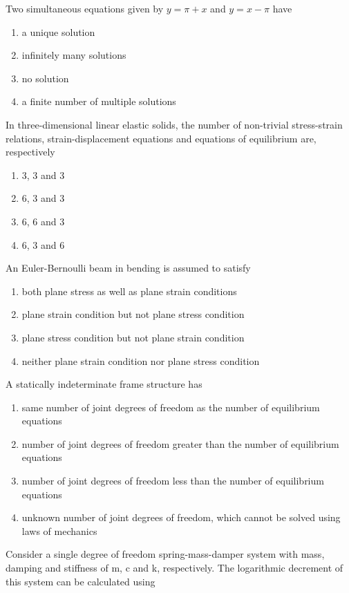 \item Two simultaneous equations given by $y = \pi + x$ and $y = x - \pi$ have
	\begin{enumerate}
		\item a unique solution
		\item infinitely many solutions
		\item no solution
		\item a finite number of multiple solutions
	\end{enumerate}
\item In three-dimensional linear elastic solids, the number of non-trivial stress-strain relations, strain-displacement equations and equations of equilibrium are, respectively
	\begin{enumerate}
		\item 3, 3 and 3
		\item 6, 3 and 3
		\item 6, 6 and 3
		\item 6, 3 and 6
	\end{enumerate}
\item An Euler-Bernoulli beam in bending is assumed to satisfy
	\begin{enumerate}
		\item both plane stress as well as plane strain conditions
		\item plane strain condition but not plane stress condition
		\item plane stress condition but not plane strain condition
		\item neither plane strain condition nor plane stress condition
	\end{enumerate}
\item A statically indeterminate frame structure has
	\begin{enumerate}
		\item same number of joint degrees of freedom as the number of equilibrium equations
		\item number of joint degrees of freedom greater than the number of equilibrium equations
		\item number of joint degrees of freedom less than the number of equilibrium equations
		\item unknown number of joint degrees of freedom, which cannot be solved using laws of mechanics
	\end{enumerate}
\item Consider a single degree of freedom spring-mass-damper system with mass, damping and stiffness of m, c and k, respectively. The logarithmic decrement of this system can be calculated using

